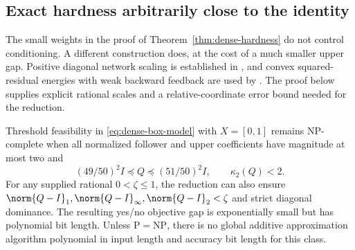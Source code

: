 \subsection{Exact hardness arbitrarily close to the identity}
\label{subsec:conditioned-hardness}
The small weights in the proof of Theorem~\ref{thm:dense-hardness} do not
control conditioning. A different
construction does, at the cost of a much smaller upper gap. Positive diagonal
network scaling is established in \citet[equations~(2.6)--(2.7)]{ElGhaouiEtAl2021},
and convex squared-residual energies with weak backward feedback are used by
\citet[Section~2]{ZachEstellers2019}. The proof below supplies explicit rational
scales and a relative-coordinate error bound needed for the reduction.

\begin{theorem}\label{thm:conditioned-hardness}
Threshold feasibility in \eqref{eq:dense-box-model} with \(X=[0,1]\) remains NP-complete when
all normalized follower and upper coefficients have magnitude at most two and
\[
 (49/50)^2 I\preceq Q\preceq(51/50)^2 I,\qquad \kappa_2(Q)<2.
\]
For any supplied rational \(0<\zeta\le1\), the reduction can also ensure
\(\norm{Q-I}_1,\norm{Q-I}_\infty,\norm{Q-I}_2<\zeta\) and strict diagonal
dominance. The resulting yes/no objective gap is exponentially small but has
polynomial bit length. Unless \(\mathrm P=\mathrm{NP}\), there is no global
additive approximation algorithm polynomial in input length and accuracy bit
length for this class.
\end{theorem}
